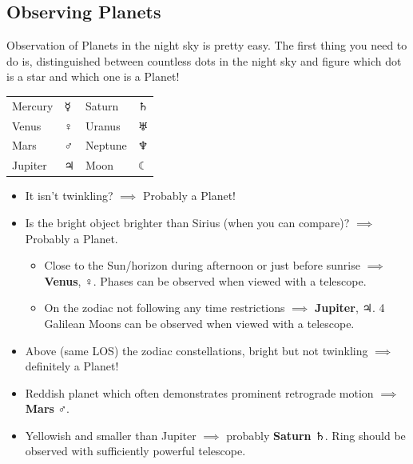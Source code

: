 \documentclass[a4paper,12pt]{extarticle}
\begin{document}
\subsection{Observing Planets}
Observation of Planets in the night sky is pretty easy. The first thing you need to do is, distinguished between countless dots in the night sky and figure which dot is a star and which one is a Planet!
	\begin{table}[H]
	\large
	\centering
	\begingroup
	\setlength{\tabcolsep}{8pt} %
	\renewcommand{\arraystretch}{1.3} %
	\begin{tabular}{|llll|}
		\hline 
		Mercury & $\bm{\Mercury}$ & Saturn  & $\bm{\Saturn}$   \\
		Venus   & $\bm{\Venus}$   & Uranus  & $\bm{\Uranus}$   \\
		Mars    & $\bm{\Mars}$    & Neptune & $\bm{\Neptune}$  \\
		Jupiter & $\bm{\Jupiter}$ & Moon    & $\leftmoon$ \\
		\hline
	\end{tabular}
	\endgroup 
\end{table}
\begin{itemize}
	\renewcommand{\labelitemi}{\textcolor{orange}{\(\bigstar\)}}
	\itemsep0em
	\item It isn't twinkling? $\implies$ Probably a Planet!
	\item Is the bright object brighter than Sirius (when you can compare)? $\implies$ Probably a Planet.
	\begin{itemize}
		\itemsep0em 
		\item Close to the Sun/horizon during afternoon or just before sunrise $\implies$ \textbf{Venus}, $\Venus$. Phases can be observed when viewed with a telescope.
		\item On the zodiac not following any time restrictions $\implies$ \textbf{Jupiter}, $\Jupiter$. 4 Galilean Moons can be observed when viewed with a telescope.
	\end{itemize}
	\item Above (same LOS) the zodiac constellations, bright but not twinkling $\implies$ definitely a Planet!
	\item Reddish planet which often demonstrates prominent retrograde motion $\implies$ \textbf{Mars} $\Mars$.
	\item Yellowish and smaller than Jupiter $\implies$ probably \textbf{Saturn} $\Saturn$. Ring should be observed with sufficiently powerful telescope.
\end{itemize}
\end{document}
